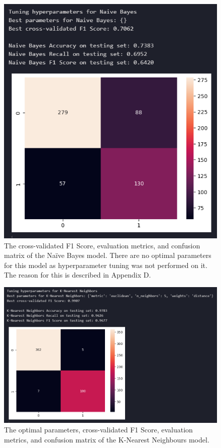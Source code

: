 \documentclass[12pt]{report}
\begin{document}
\begin{figure}[H]
    \centering
    \includegraphics[width=\linewidth]{ModelDev/Iteration2/Results/NB.png}
    \caption{The cross-validated F1 Score, evaluation metrics, and confusion matrix of the Na\"ive Bayes model. There are no optimal 
    parameters for this model as hyperparameter tuning was not performed on it. The reason for this is described in Appendix D.}
    \label{fig:NBIteration2}
\end{figure}

\begin{figure}[H]
    \centering
    \includegraphics[width=\linewidth]{ModelDev/Iteration2/Results/KNN.png}
    \caption{The optimal parameters, cross-validated F1 Score, evaluation metrics, and confusion matrix of the K-Nearest Neighbours model.}
    \label{fig:KNNIteration2}
\end{figure}
\end{document}
